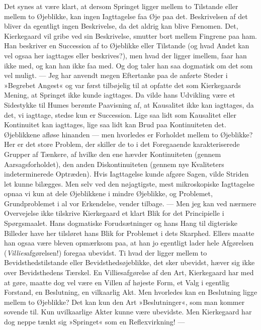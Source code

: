 \documentclass[12pt,a4paper,openany]{book}
\newcommand{\opage}[1]{\marginnote{\footnotesize\textit{[#1]}}}
\begin{document}
Det synes at være klart, at dersom Springet ligger
mellem to Tilstande eller mellem to Øjeblikke, kan ingen
Iagttagelse faa Øje paa det. Beskrivelsen af det bliver
da egentligt ingen Beskrivelse, da det aldrig kan blive
Fænomen. Det, Kierkegaard vil gribe ved sin Beskrivelse,
smutter bort mellem Fingrene paa ham. Han beskriver en
Succession af to Øjeblikke eller Tilstande (og hvad Andet
kan vel ogsaa her iagttages eller beskrives?), men hvad der
ligger imellem, faar han ikke med, og kan han ikke faa med.
Og dog taler han saa dogmatisk om det som vel muligt. ---
Jeg har anvendt megen Eftertanke paa de anførte Steder
i »Begrebet Angest« og var først tilbøjelig til at opfatte
det som Kierkegaards Mening, at Springet ikke kunde
iagttages. Da vilde hans Udvikling være et Sidestykke
til Humes berømte Paavisning af, at Kausalitet ikke kan
iagttages, da det, vi iagttage, stedse kun er Succession.
Lige saa lidt som Kausalitet eller Kontinuitet kan iagttages,
lige saa lidt kan Brud paa Kontinuiteten det.
Øjeblikkene afløse hinanden --- men hvorledes er Forholdet
mellem to Øjeblikke? Her er det store Problem,
der skiller de to i det Foregaaende karakteriserede
Grupper af Tænkere, af hvilke den ene hævder Kontinuiteten
(gennem Aarsagsforholdet), den anden Diskontinuiteten
(gennem nye Kvaliteters indeterminerede Optræden).
Hvis Iagttagelse kunde afgøre Sagen, vilde Striden
let kunne bilægges. Men selv ved den nøjagtigste, mest
mikroskopiske Iagttagelse opnaa vi kun at dele Øjeblikkene
i mindre Øjeblikke, og Problemet, Grundproblemet
i al vor Erkendelse, vender tilbage. --- Men jeg kan ved
\opage{80}nærmere Overvejelse ikke tilskrive Kierkegaard et klart
Blik for det Principielle i Spørgsmaalet. Hans dogmatiske
Forudsætninger og hans Hang til digteriske Billeder have
her tilsløret hans Blik for Problemet i dets Skarphed.
Ellers maatte han ogsaa være bleven opmærksom paa, at
han jo egentligt lader hele Afgørelsen (\textit{Villies}afgørelsen!)
foregaa ubevidst. Ti hvad der ligger mellem to Bevidsthedstilstande
eller Bevidsthedsøjeblikke, det sker ubevidst,
hæver sig ikke over Bevidsthedens Tærskel. En Villiesafgørelse
af den Art, Kierkegaard har med at gøre,
maatte dog vel være en Villen af højeste Form, et Valg
i egentlig Forstand, en Beslutning, en vilkaarlig Akt.
Men hvorledes kan en Beslutning ligge mellem to Øjeblikke?
Det kan kun den Art »Beslutninger«, som man
kommer sovende til. Kun uvilkaarlige Akter kunne være
ubevidste. Men Kierkegaard har dog neppe tænkt sig
»Springet« som en Reflexvirkning! ---
\end{document}

